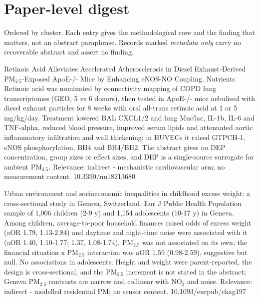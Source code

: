 \documentclass[10pt]{article}
\begin{document}
\vspace{4mm}

\par{}\baselineskip{}\baselineskip
\section*{\sffamily\bfseries\color{Deep}Paper-level digest}
\vspace{-1.5mm}{\color{Amber}\rule{\linewidth}{1.1pt}}\vspace{2.5mm}

{\fontsize{7.4}{9}\selectfont\color{Slate}Ordered by cluster. Each entry gives the
methodological core and the finding that matters, not an abstract paraphrase. Records
marked \textit{metadata only} carry no recoverable abstract and assert no finding.\par}


{Retinoic Acid Alleviates Accelerated Atherosclerosis in Diesel Exhaust-Derived PM$_{2.5}$-Exposed ApoE-/- Mice by Enhancing eNOS-NO Coupling.}
{Nutrients}
{Retinoic acid was nominated by connectivity mapping of COPD lung transcriptomes (GEO, 5 vs 6 donors), then tested in ApoE-/- mice nebulised with diesel exhaust particles for 8 weeks with oral all-trans retinoic acid at 1 or 5 mg/kg/day. Treatment lowered BAL CXCL1/2 and lung Muc5ac, IL-1b, IL-6 and TNF-alpha, reduced blood pressure, improved serum lipids and attenuated aortic inflammatory infiltration and wall thickening; in HUVECs it raised GTPCH-1, eNOS phosphorylation, BH4 and BH4/BH2. The abstract gives no DEP concentration, group sizes or effect sizes, and DEP is a single-source surrogate for ambient PM$_{2.5}$. Relevance: indirect - mechanistic cardiovascular arm; no measurement content.}
{10.3390/nu18213680}

{Urban environment and socioeconomic inequalities in childhood excess weight: a cross-sectional study in Geneva, Switzerland.}
{Eur J Public Health}
{Population sample of 1,006 children (2-9 y) and 1,154 adolescents (10-17 y) in Geneva. Among children, average-to-poor household finances raised odds of excess weight (aOR 1.79, 1.13-2.84) and daytime and night-time noise were associated with it (aOR 1.40, 1.10-1.77; 1.37, 1.08-1.74). PM$_{2.5}$ was not associated on its own; the financial situation x PM$_{2.5}$ interaction was aOR 1.59 (0.98-2.59), suggestive but null. No associations in adolescents. Height and weight were parent-reported, the design is cross-sectional, and the PM$_{2.5}$ increment is not stated in the abstract; Geneva PM$_{2.5}$ contrasts are narrow and collinear with NO$_2$ and noise. Relevance: indirect - modelled residential PM; no sensor content.}
{10.1093/eurpub/ckag197}
\end{document}
